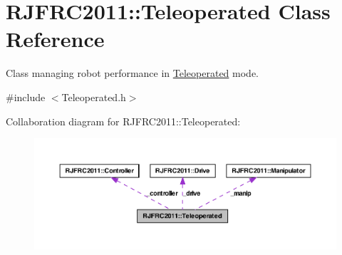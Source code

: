 \hypertarget{class_r_j_f_r_c2011_1_1_teleoperated}{
\section{RJFRC2011::Teleoperated Class Reference}
\label{class_r_j_f_r_c2011_1_1_teleoperated}
}


Class managing robot performance in \hyperlink{class_r_j_f_r_c2011_1_1_teleoperated}{Teleoperated} mode.  




{\ttfamily \#include $<$Teleoperated.h$>$}



Collaboration diagram for RJFRC2011::Teleoperated:
\nopagebreak
\begin{figure}[H]
\begin{center}
\leavevmode
\includegraphics[width=400pt]{class_r_j_f_r_c2011_1_1_teleoperated__coll__graph}
\end{center}
\end{figure}
